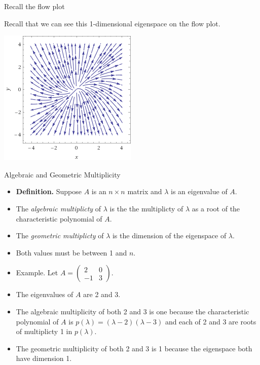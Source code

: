 \documentclass{beamer}
\begin{document}
\begin{frame}{Recall the flow plot}


Recall that we can see this 1-dimensional eigenspace on the flow plot.

\pause

\begin{center}
\includegraphics[scale=0.45]{stream1}
\end{center}

\end{frame}

\begin{frame}{Algebraic and Geometric Multiplicity}

\begin{itemize}
\item \textbf{Definition.} Suppose $A$ is an $n\times n$ matrix and $\lambda$ is an eigenvalue of $A$.
\item The \emph{algebraic multiplicty} of $\lambda$ is the the multiplicty of $\lambda$ as a root
of the characteristic polynomial of $A$.
\item The \emph{geometric multiplicty} of $\lambda$ is the dimension of the eigenspace of $\lambda$.
\item Both values must be between 1 and $n$.
\item Example.  Let
$A=
\begin{pmatrix}
2 & 0 \\
-1 & 3
\end{pmatrix}
$.
\item The eigenvalues of $A$ are 2 and 3.
\item The algebraic multiplicity of both 2 and 3 is one because the characteristic
polynomial of $A$ is $p(\lambda) = (\lambda -2)(\lambda -3)$ and each of 2 and 3
are roots of multiplicty 1 in $p(\lambda)$.
\item The geometric multiplicity of both 2 and 3 is 1 because the eigenspace
both have dimension 1.
\end{itemize}
\end{frame}
\end{document}
